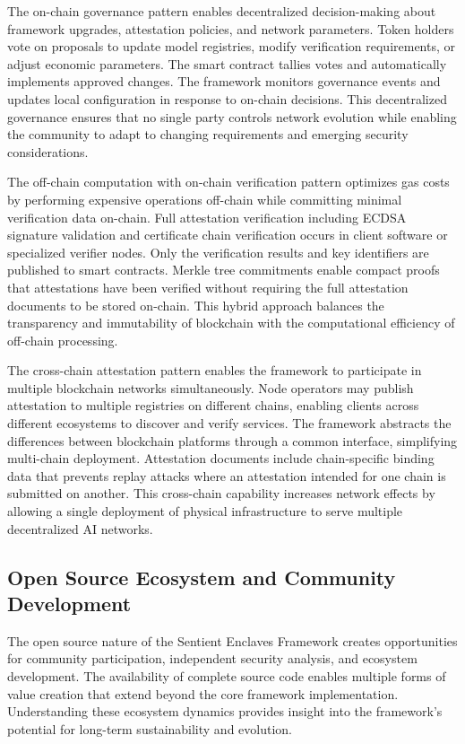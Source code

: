 The on-chain governance pattern enables decentralized decision-making about framework upgrades, attestation policies, and network parameters. Token holders vote on proposals to update model registries, modify verification requirements, or adjust economic parameters. The smart contract tallies votes and automatically implements approved changes. The framework monitors governance events and updates local configuration in response to on-chain decisions. This decentralized governance ensures that no single party controls network evolution while enabling the community to adapt to changing requirements and emerging security considerations.

The off-chain computation with on-chain verification pattern optimizes gas costs by performing expensive operations off-chain while committing minimal verification data on-chain. Full attestation verification including ECDSA signature validation and certificate chain verification occurs in client software or specialized verifier nodes. Only the verification results and key identifiers are published to smart contracts. Merkle tree commitments enable compact proofs that attestations have been verified without requiring the full attestation documents to be stored on-chain. This hybrid approach balances the transparency and immutability of blockchain with the computational efficiency of off-chain processing.

The cross-chain attestation pattern enables the framework to participate in multiple blockchain networks simultaneously. Node operators may publish attestation to multiple registries on different chains, enabling clients across different ecosystems to discover and verify services. The framework abstracts the differences between blockchain platforms through a common interface, simplifying multi-chain deployment. Attestation documents include chain-specific binding data that prevents replay attacks where an attestation intended for one chain is submitted on another. This cross-chain capability increases network effects by allowing a single deployment of physical infrastructure to serve multiple decentralized AI networks.

\subsection{Open Source Ecosystem and Community Development}

The open source nature of the Sentient Enclaves Framework creates opportunities for community participation, independent security analysis, and ecosystem development. The availability of complete source code enables multiple forms of value creation that extend beyond the core framework implementation. Understanding these ecosystem dynamics provides insight into the framework's potential for long-term sustainability and evolution.

